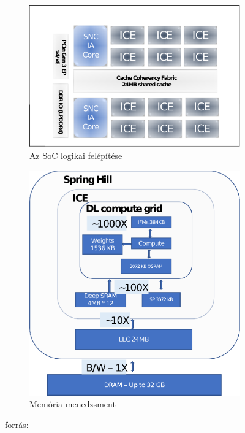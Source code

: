 \begin{figure}[H]
	\centering
	\begin{subfigure}{0.4\textwidth}
		\includegraphics[width=\textwidth]{fig/NNP-I_soc}
		\caption{Az SoC logikai felépítése}
		\label{fig:nnp-isoc}
	\end{subfigure}
	\quad
	\begin{subfigure}{0.4\textwidth}
		\includegraphics[width=\textwidth]{fig/NNP-I_memManagement}
		\caption{Memória menedzsment}
		\label{fig:nnp-imem}
	\end{subfigure}
	\caption{ \footnotesize forrás:\cite{Wechsler-nnpi}}
	\label{fig:nnp-i}
\end{figure}

